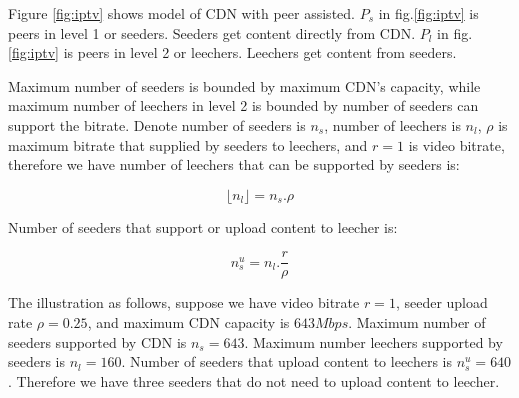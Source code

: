 \documentclass[JIP]{ipsj}
\begin{document}
Figure \ref{fig:iptv} shows model of CDN with peer assisted.  
$P_s$ in fig.\ref{fig:iptv} is peers in level 1 or seeders.  
Seeders get content directly from CDN.  
$P_l$ in fig.\ref{fig:iptv} is peers in level 2 or leechers.
Leechers get content from seeders.

Maximum number of seeders is bounded by maximum CDN's capacity, while maximum number of leechers in level 2 is bounded by number of seeders can support the bitrate.
Denote number of seeders is $n_s$, number of leechers is $n_l$, $\rho$ is maximum bitrate that supplied by seeders to leechers, and $r=1$ is video bitrate, therefore we have number of leechers that can be supported by seeders is:

\begin{equation}\label{eqn:leecher}
	\lfloor n_l \rfloor = n_s . \rho
\end{equation}

Number of seeders that support or upload content to leecher is:

\begin{equation}\label{eqn:seeders-to-leechers}
	n_{s}^{u} = n_l . \frac{r}{\rho}
\end{equation}

The illustration as follows, suppose we have video bitrate $r=1$, seeder upload rate $\rho=0.25$, and maximum CDN capacity is $643Mbps$. 
Maximum number of seeders supported by CDN is $n_s=643$.
Maximum number leechers supported by seeders is $n_l=160$.  
Number of seeders that upload content to leechers is $n_{s}^{u}=640$.  
Therefore we have three seeders that do not need to upload content to leecher. 
\end{document}
